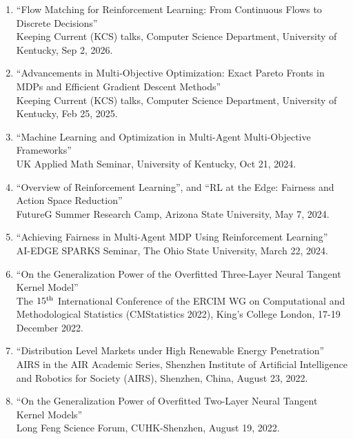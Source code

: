 \documentclass[10pt,letter]{article}
\begin{document}
\begin{small}
\begin{enumerate}[itemsep=0.5em]

    \item ``Flow Matching for Reinforcement Learning: From Continuous Flows to Discrete Decisions''\\
    Keeping Current (KCS) talks, Computer Science Department, University of Kentucky, Sep 2, 2026.

    \item ``Advancements in Multi-Objective Optimization: Exact Pareto Fronts in MDPs and Efficient Gradient Descent Methods''\\
    Keeping Current (KCS) talks, Computer Science Department, University of Kentucky, Feb 25, 2025.

    \item ``Machine Learning and Optimization in Multi-Agent Multi-Objective Frameworks''\\
    UK Applied Math Seminar, University of Kentucky, Oct 21, 2024.

    \item ``Overview of Reinforcement Learning'', and ``RL at the Edge: Fairness and Action Space Reduction''\\
    FutureG Summer Research Camp, Arizona State University, May 7, 2024.

    \item ``Achieving Fairness in Multi-Agent MDP Using Reinforcement Learning''\\
    AI-EDGE SPARKS Seminar, The Ohio State University, March 22, 2024.

    \item ``On the Generalization Power of the Overfitted Three-Layer Neural Tangent Kernel Model''\\
    The $15\textsuperscript{th}$ International Conference of the ERCIM WG on Computational and Methodological Statistics (CMStatistics 2022), King's College London, 17-19 December 2022.
    

    
    \item ``Distribution Level Markets under High Renewable Energy Penetration''\\
    AIRS in the AIR Academic Series, Shenzhen Institute of Artificial Intelligence and Robotics for Society (AIRS), Shenzhen, China, August 23, 2022.
    
    \item ``On the Generalization Power of Overfitted Two-Layer Neural Tangent Kernel Models''\\
    Long Feng Science Forum, CUHK-Shenzhen, August 19, 2022.
    

\end{enumerate}
\end{small}
\end{document}
